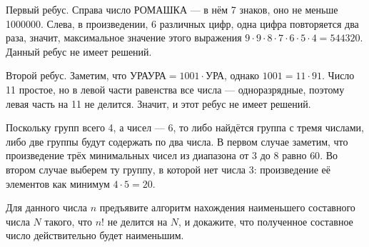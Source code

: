 \begin{itemize}
\itA Первый ребус. Справа число РОМАШКА --- в нём 7 знаков, оно не меньше 1000000.
Слева, в произведении, 6 различных цифр, одна цифра повторяется два раза, значит, максимальное
значение этого выражения $9\cdot 9 \cdot 8 \cdot 7 \cdot 6 \cdot 5 \cdot 4 = 544320$.
Данный ребус не имеет решений.

Второй ребус. Заметим, что $\text{УРАУРА} = 1001 \cdot \text{УРА}$, однако $1001 = 11 \cdot 91$.
Число 11 простое, но в левой части равенства все числа --- одноразрядные, поэтому левая часть
на 11 не делится. Значит, и этот ребус не имеет решений.

\itB Поскольку групп всего 4, а чисел --- 6, то либо найдётся группа с тремя числами, либо две
группы будут содержать по два числа. В первом случае заметим, что произведение трёх минимальных
чисел из диапазона от 3 до 8 равно $60$. Во втором случае выберем ту группу, в которой нет 
числа 3: произведение её элементов как минимум $4 \cdot 5 = 20$.

\itC Для данного числа $n$ предъявите алгоритм нахождения наименьшего составного числа $N$ 
такого, что $n!$ не делится на $N$, и докажите, что полученное составное число действительно
будет наименьшим.


\end{itemize}
